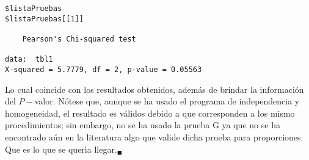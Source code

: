 \begin{solucion}
\begin{verbatim}
$listaPruebas
$listaPruebas[[1]]

	Pearson's Chi-squared test

data:  tbl1
X-squared = 5.7779, df = 2, p-value = 0.05563
 \end{verbatim}
 \vspace{-0.5cm}
 Lo cual coincide con los resultados obtenidos,
 adem\'as de brindar la informaci\'on del $P-$valor.
 N\'otese que, aunque se ha usado el programa de independencia
 y homogeneidad, el resultado es v\'alidos debido a que corresponden
 a los mismo procedimientos;
 sin embargo, no se ha usado la prueba G ya que no se ha encontrado a\'un
 en la literatura algo que valide dicha prueba para proporciones.
 Que es lo que se quer\'{\i}a llegar.${}_{\blacksquare}$
\end{solucion}
